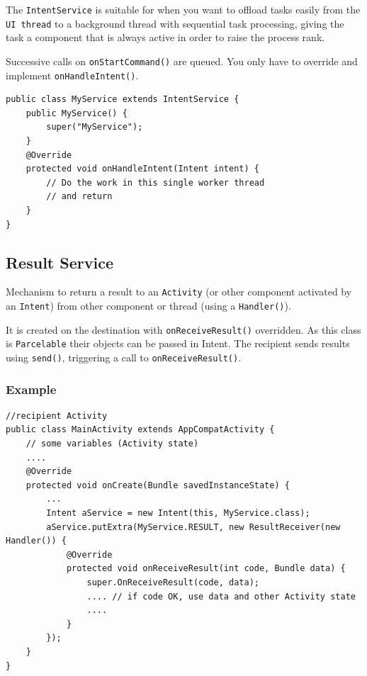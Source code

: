 The \texttt{IntentService} is suitable for when you want to offload tasks easily 
from the \texttt{UI thread} to a background thread with sequential task processing, 
giving the task a component that is always active in order to raise the process rank.

Successive calls on \texttt{onStartCommand()} are queued. You only have to override and implement
\texttt{onHandleIntent()}. 

\begin{lstlisting}[title=IntentService implementation]
public class MyService extends IntentService {
    public MyService() {
        super("MyService");
    }
    @Override
    protected void onHandleIntent(Intent intent) {
        // Do the work in this single worker thread
        // and return
    }
}
\end{lstlisting}

\subsection{Result Service}
Mechanism to return a result to an \texttt{Activity} (or other component activated by an \texttt{Intent}) from
other component or thread (using a \texttt{Handler()}). 

It is created on the destination with \texttt{onReceiveResult()} overridden.
As this class is \texttt{Parcelable} their objects can be passed in Intent.
The recipient sends results using \texttt{send()}, triggering a call to \texttt{onReceiveResult()}.

\subsubsection{Example}

\begin{lstlisting}[title=Recipient component (an activity)]
//recipient Activity
public class MainActivity extends AppCompatActivity {
    // some variables (Activity state)
    ....
    @Override
    protected void onCreate(Bundle savedInstanceState) {
        ...
        Intent aService = new Intent(this, MyService.class);
        aService.putExtra(MyService.RESULT, new ResultReceiver(new Handler()) {
            @Override
            protected void onReceiveResult(int code, Bundle data) {
                super.OnReceiveResult(code, data);
                .... // if code OK, use data and other Activity state
                ....
            }
        });
    }
}
\end{lstlisting}

